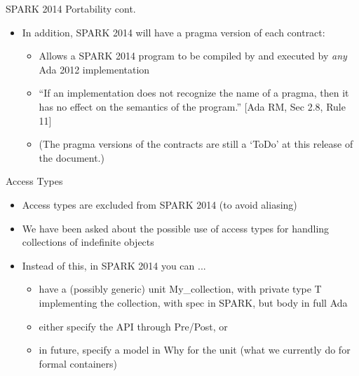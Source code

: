 \documentclass{beamer}
\begin{document}
\begin{frame}{SPARK 2014 Portability cont.}

  \begin{itemize}
  \item In addition, SPARK 2014 will have a pragma version of each contract:

    \begin{itemize}
    \item Allows a SPARK 2014 program to be compiled by and executed by \emph{any} Ada 2012 implementation

    \item ``If an implementation does not recognize the name of a pragma, then it has no effect on the semantics of the program.'' [Ada RM, Sec 2.8, Rule 11]

    \item (The pragma versions of the contracts are still a `ToDo' at this release of the document.)

    \end{itemize}

\end{itemize}

\end{frame}

\begin{frame}{Access Types}

  \begin{itemize}
  \item Access types are excluded from SPARK 2014 (to avoid aliasing)
  \item We have been asked about the possible use of access types for handling collections of indefinite objects
  \item Instead of this, in SPARK 2014 you can ...

    \begin{itemize}
    \item have a (possibly generic) unit My\_collection, with private type T implementing the collection, with spec in SPARK, but body in full Ada
    \item either specify the API through Pre/Post, or
    \item in future, specify a model in Why for the unit (what we currently
      do for formal containers)
    \end{itemize}

  \end{itemize}

\end{frame}
\end{document}
